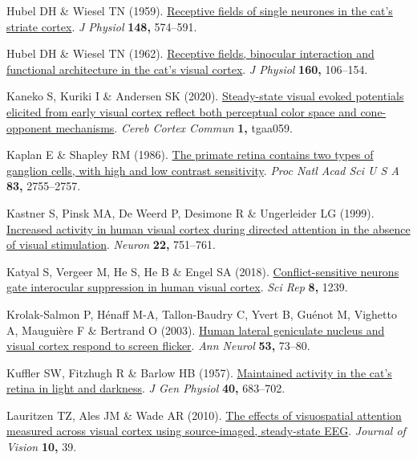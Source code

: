 \documentclass[
  letterpaper,
  DIV=11,
  numbers=noendperiod]{scrartcl}
\newlength{\cslhangindent}
\newenvironment{CSLReferences}[2] %
 {\begin{list}{}{%
  \setlength{\itemindent}{0pt}
  \setlength{\leftmargin}{0pt}
  \setlength{\parsep}{0pt}
  \ifodd #1
   \setlength{\leftmargin}{\cslhangindent}
   \setlength{\itemindent}{-1\cslhangindent}
  \fi
  \setlength{\itemsep}{#2\baselineskip}}}
 {\end{list}}
\begin{document}
\begin{CSLReferences}{1}{1}
Hubel DH \& Wiesel TN (1959).
\href{https://doi.org/10.1113/jphysiol.1959.sp006308}{Receptive fields
of single neurones in the cat's striate cortex}. \emph{J Physiol}
\textbf{148,} 574--591.

Hubel DH \& Wiesel TN (1962).
\href{https://doi.org/10.1113/jphysiol.1962.sp006837}{Receptive fields,
binocular interaction and functional architecture in the cat's visual
cortex}. \emph{J Physiol} \textbf{160,} 106--154.

Kaneko S, Kuriki I \& Andersen SK (2020).
\href{https://doi.org/10.1093/texcom/tgaa059}{Steady-state visual evoked
potentials elicited from early visual cortex reflect both perceptual
color space and cone-opponent mechanisms}. \emph{Cereb Cortex Commun}
\textbf{1,} tgaa059.

Kaplan E \& Shapley RM (1986).
\href{https://doi.org/10.1073/pnas.83.8.2755}{The primate retina
contains two types of ganglion cells, with high and low contrast
sensitivity}. \emph{Proc Natl Acad Sci U S A} \textbf{83,} 2755--2757.

Kastner S, Pinsk MA, De Weerd P, Desimone R \& Ungerleider LG (1999).
\href{https://doi.org/10.1016/s0896-6273(00)80734-5}{Increased activity
in human visual cortex during directed attention in the absence of
visual stimulation}. \emph{Neuron} \textbf{22,} 751--761.

Katyal S, Vergeer M, He S, He B \& Engel SA (2018).
\href{https://doi.org/10.1038/s41598-018-19809-w}{Conflict-sensitive
neurons gate interocular suppression in human visual cortex}. \emph{Sci
Rep} \textbf{8,} 1239.

Krolak-Salmon P, Hénaff M-A, Tallon-Baudry C, Yvert B, Guénot M,
Vighetto A, Mauguière F \& Bertrand O (2003).
\href{https://doi.org/10.1002/ana.10403}{Human lateral geniculate
nucleus and visual cortex respond to screen flicker}. \emph{Ann Neurol}
\textbf{53,} 73--80.

Kuffler SW, Fitzhugh R \& Barlow HB (1957).
\href{https://doi.org/10.1085/jgp.40.5.683}{Maintained activity in the
cat's retina in light and darkness}. \emph{J Gen Physiol} \textbf{40,}
683--702.

Lauritzen TZ, Ales JM \& Wade AR (2010).
\href{https://doi.org/10.1167/10.14.39}{The effects of visuospatial
attention measured across visual cortex using source-imaged,
steady-state {EEG}}. \emph{Journal of Vision} \textbf{10,} 39.


\end{CSLReferences}
\end{document}
